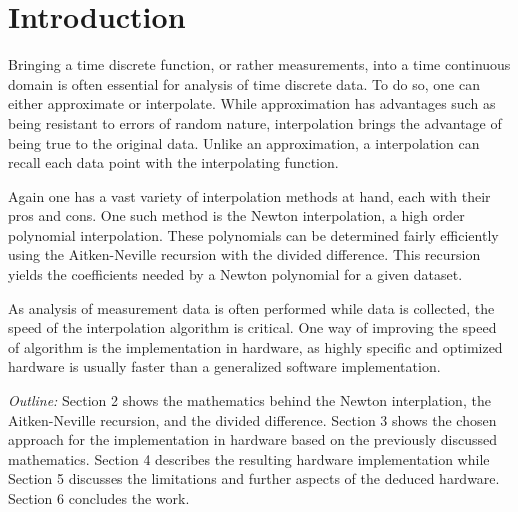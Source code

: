 \section{Introduction}

Bringing a time discrete function, or rather measurements, into a time
continuous domain is often essential for analysis of time discrete data. To do
so, one can either approximate or interpolate. While approximation has
advantages such as being resistant to errors of random nature, interpolation
brings the advantage of being true to the original data. Unlike an
approximation, a interpolation can recall each data point with the
interpolating function.

Again one has a vast variety of interpolation methods at hand, each with their
pros and cons. One such method is the Newton interpolation, a high order
polynomial interpolation. These polynomials can be determined fairly
efficiently using the Aitken-Neville recursion with the divided difference.
This recursion yields the coefficients needed by a Newton polynomial for a
given dataset.

As analysis of measurement data is often performed while data is collected,
the speed of the interpolation algorithm is critical. One way of improving the
speed of algorithm is the implementation in hardware, as highly specific and
optimized hardware is usually faster than a generalized software implementation.

\textit{Outline:} Section 2 shows the mathematics behind the Newton
interplation, the Aitken-Neville recursion, and the divided difference.
Section 3 shows the chosen approach for the implementation in hardware based
on the previously discussed mathematics. Section 4 describes the resulting
hardware implementation while Section 5 discusses the limitations and further
aspects of the deduced hardware. Section 6 concludes the work.
